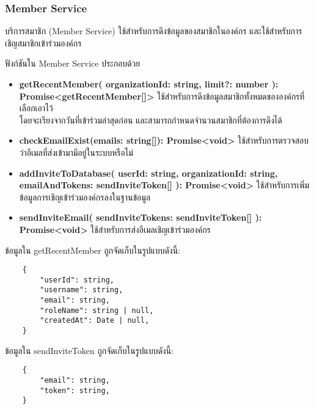 \subsubsection{Member Service}

\ifenglish
\else
บริการสมาชิก (Member Service) ใช้สำหรับการดึงข้อมูลของสมาชิกในองค์กร และใช้สำหรับการเชิญสมาชิกเข้าร่วมองค์กร

ฟังก์ชันใน Member Service ประกอบด้วย

\begin{itemize}
    \item \textbf{getRecentMember(
        organizationId: string,
        limit?: number
      ): \\Promise<getRecentMember[]>} ใช้สำหรับการดึงข้อมูลสมาชิกทั้งหมดขององค์กรที่เลือกเอาไว้ \\โดยจะเรียงจากวันที่เข้าร่วมล่าสุดก่อน และสามารถกำหนดจำนวนสมาชิกที่ต้องการดึงได้
    \item \textbf{checkEmailExist(emails: string[]): Promise<void>} ใช้สำหรับการตรวจสอบว่าอีเมลที่ส่งเข้ามามีอยู่ในระบบหรือไม่
    \item \textbf{addInviteToDatabase(
        userId: string,
        organizationId: string,
        emailAndTokens: sendInviteToken[]
      ): Promise<void>} ใช้สำหรับการเพิ่มข้อมูลการเชิญเข้าร่วมองค์กรลงในฐานข้อมูล
    \item \textbf{sendInviteEmail(
        sendInviteTokens: sendInviteToken[]
      ): Promise<void>} ใช้สำหรับการส่งอีเมลเชิญเข้าร่วมองค์กร
\end{itemize}

\clearpage

ข้อมูลใน getRecentMember ถูกจัดเก็บในรูปแบบดังนี้:
\begin{lstlisting}
    {  
        "userId": string,
        "username": string,
        "email": string,
        "roleName": string | null,
        "createdAt": Date | null,
    }
\end{lstlisting}

ข้อมูลใน sendInviteToken ถูกจัดเก็บในรูปแบบดังนี้:
\begin{lstlisting}
    {
        "email": string,
        "token": string,
    }
\end{lstlisting}
\fi